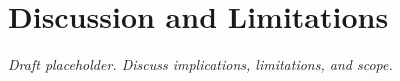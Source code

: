 \section{Discussion and Limitations}
\label{sec:discussion}
\emph{Draft placeholder. Discuss implications, limitations, and scope.}
